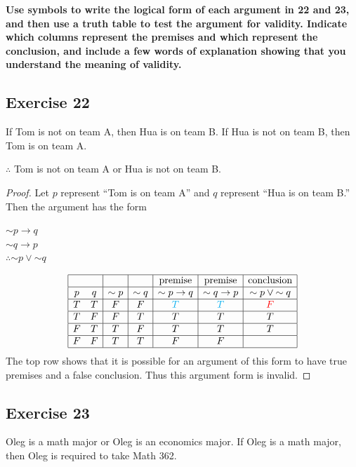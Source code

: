 \documentclass[14pt]{extarticle}
\begin{document}
{\bf \color{cyan} Use symbols to write the logical form of each argument in 22
and 23, and then use a truth table to test the argument for validity. Indicate
which columns represent the premises and which represent the conclusion, and
include a few words of explanation showing that you understand the meaning of
validity.}

\subsection{Exercise 22} If Tom is not on team A, then Hua is on team B.
If Hua is not on team B, then Tom is on team A.

$\therefore$ Tom is not on team A or Hua is not on team B.

\begin{proof} Let $p$ represent “Tom is on team A” and $q$ represent “Hua is on
team B.” Then the argument has the form

\begin{center} ${\sim p} \to q$ \\ ${\sim q} \to p$ \\ $\therefore {\sim p} \vee
{\sim q}$ \\ \end{center}

$$ \begin{array}{|cc|c|c|c|c|c|} \hline &&&& \text{premise} & \text{premise} &
\text{conclusion} \\ \hline p & q & {\sim p} & {\sim q} & {\sim p} \to q & {\sim
q} \to p & {\sim p} \vee {\sim q} \\ \hline T & T & F & F & \color{cyan}T &
\color{cyan}T & \color{red}F \\ \hline T & F & F & T & T & T & T \\ \hline F & T
& T & F & T & T & T \\ \hline F & F & T & T & F & F & \\ \hline \end{array} $$
The top row shows that it is possible for an argument of this form to have true
premises and a false conclusion. Thus this argument form is invalid. \end{proof}

\subsection{Exercise 23} Oleg is a math major or Oleg is an economics major.
If Oleg is a math major, then Oleg is required to take Math 362.
\end{document}
